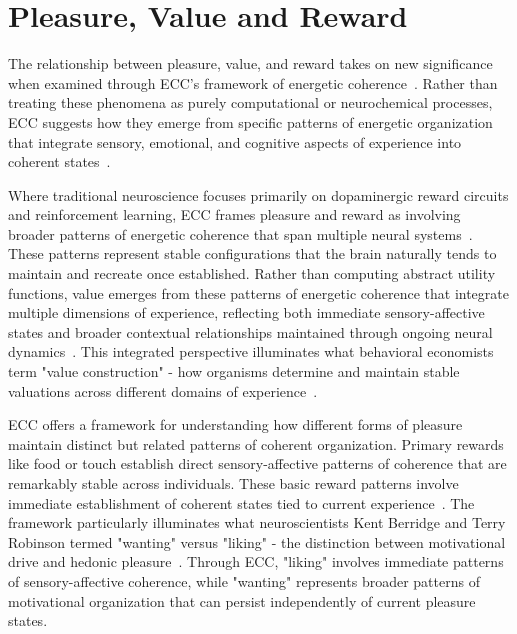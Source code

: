 \section{Pleasure, Value and Reward}


The relationship between pleasure, value, and reward takes on new significance when examined through ECC's framework of energetic coherence~\cite{barrett2017emotions}. Rather than treating these phenomena as purely computational or neurochemical processes, ECC suggests how they emerge from specific patterns of energetic organization that integrate sensory, emotional, and cognitive aspects of experience into coherent states~\cite{damasio2006descartes, mercier2017enigma}.

Where traditional neuroscience focuses primarily on dopaminergic reward circuits and reinforcement learning, ECC frames pleasure and reward as involving broader patterns of energetic coherence that span multiple neural systems~\cite{pinotsis2023cytoelectric}. These patterns represent stable configurations that the brain naturally tends to maintain and recreate once established. Rather than computing abstract utility functions, value emerges from these patterns of energetic coherence that integrate multiple dimensions of experience, reflecting both immediate sensory-affective states and broader contextual relationships maintained through ongoing neural dynamics~\cite{bakhtin2010dialogic, van2025processes}. This integrated perspective illuminates what behavioral economists term "value construction" - how organisms determine and maintain stable valuations across different domains of experience~\cite{habermas2001pragmatics}.

ECC offers a framework for understanding how different forms of pleasure maintain distinct but related patterns of coherent organization. Primary rewards like food or touch establish direct sensory-affective patterns of coherence that are remarkably stable across individuals. These basic reward patterns involve immediate establishment of coherent states tied to current experience~\cite{zheng2025unbearable}. The framework particularly illuminates what neuroscientists Kent Berridge and Terry Robinson termed "wanting" versus "liking" - the distinction between motivational drive and hedonic pleasure~\cite{barrett2017emotions}. Through ECC, "liking" involves immediate patterns of sensory-affective coherence, while "wanting" represents broader patterns of motivational organization that can persist independently of current pleasure states.

